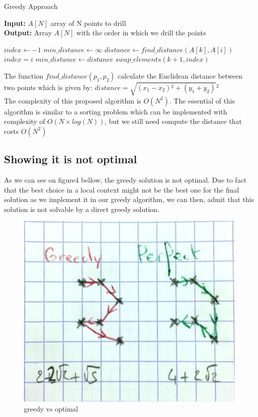 \documentclass{article}
\begin{document}
\begin{algorithm}[H]
\caption{Greedy Approach}
\textbf{Input: }$A[N]$ array of N points to drill\\
\textbf{Output: } Array $A[N]$ with the order in which we drill the points
\begin{algorithmic} 
    \State $index \leftarrow -1$
    \State $min\_distance \leftarrow \infty $
        \State $distance \leftarrow find\_distance(A[k], A[i])$
            \State $index = i$ 
            \State $min\_distance \leftarrow distance$
        \EndIf
    \EndFor
    \State $swap\_elements(k+1, index)$
\EndFor
\end{algorithmic}
\end{algorithm}
The function $find\_distance(p_{1}, p_{2})$ calculate the Euclidean distance between two points which is given by:
$distance = \sqrt{(x_{1}-x_{2}){^2} + (y_{1}+y_{2})}{^2} $ \\[0.3cm]
The complexity of this proposed algorithm is $O(N^{2})$. The essential of this algorithm is similar to a sorting problem which can be implemented with complexity of $O(N \times log(N))$, but we still need compute the distance that costs $O(N^{2})$ 
\subsection{Showing it is not optimal}
As we can see on figure4 bellow, the greedy solution is not optimal. Due to fact that the best choice in a local context might not be the best one for the final solution as we implement it in our greedy algorithm, we can then, admit that this solution is not solvable by a direct greedy solution.

\begin{figure}[h]
\centering \includegraphics[width=0.5\linewidth]{not_optimal.png}
\caption{greedy vs optimal}
\end{figure}
\end{document}
